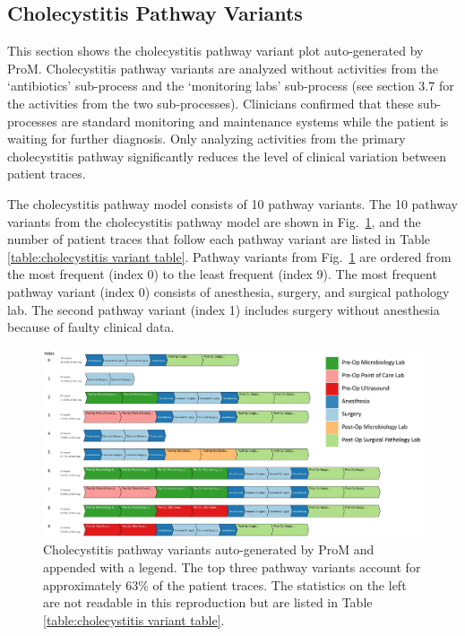 \subsection{Cholecystitis Pathway Variants}
This section shows the cholecystitis pathway variant plot auto-generated by ProM. Cholecystitis pathway variants are analyzed without activities from the `antibiotics' sub-process and the `monitoring labs' sub-process (see section 3.7 for the activities from the two sub-processes). Clinicians confirmed that these sub-processes are standard monitoring and maintenance systems while the patient is waiting for further diagnosis. Only analyzing activities from the primary cholecystitis pathway significantly reduces the level of clinical variation between patient traces.

The cholecystitis pathway model consists of 10 pathway variants. The 10 pathway variants from the cholecystitis pathway model are shown in Fig.~\ref{fig:cholecystitis pathway variants}, and the number of patient traces that follow each pathway variant are listed in Table \ref{table:cholecystitis variant table}. Pathway variants from Fig.~\ref{fig:cholecystitis pathway variants} are ordered from the most frequent (index 0) to the least frequent (index 9). The most frequent pathway variant (index 0) consists of anesthesia, surgery, and surgical pathology lab. The second pathway variant (index 1) includes surgery without anesthesia because of faulty clinical data.

\begin{figure}[t]
\hspace{-2cm}
\includegraphics[width=1.5\textwidth]{images/cholecystitis_variant_index_anes.jpg}
\caption{Cholecystitis pathway variants auto-generated by ProM and appended with a legend. The top three pathway variants account for approximately 63\% of the patient traces. The statistics on the left are not readable in this reproduction but are listed in Table \ref{table:cholecystitis variant table}.}
\label{fig:cholecystitis pathway variants}
\end{figure}


